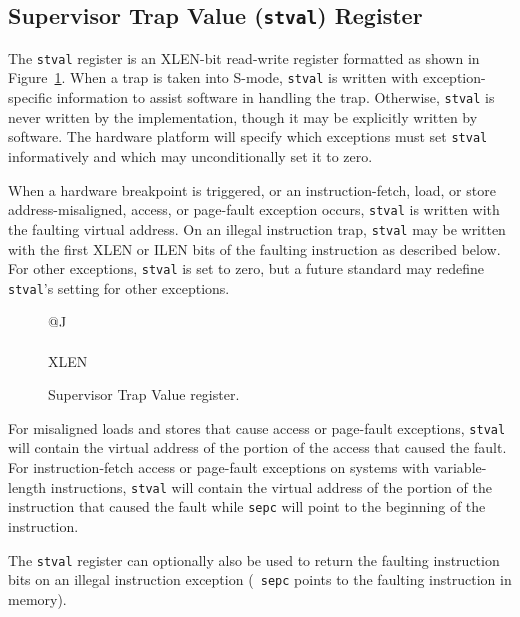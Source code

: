 \subsection{Supervisor Trap Value ({\tt stval}) Register}

The {\tt stval} register is an XLEN-bit read-write register formatted as shown
in Figure~\ref{stvalreg}.  When a trap is taken into S-mode, {\tt stval} is
written with exception-specific information to assist software in handling the
trap.  Otherwise, {\tt stval} is never written by the implementation, though
it may be explicitly written by software.  The hardware platform will specify
which exceptions must set {\tt stval} informatively and which may
unconditionally set it to zero.


When a hardware breakpoint is triggered, or an instruction-fetch, load, or
store address-misaligned, access, or page-fault exception occurs, {\tt stval}
is written with the faulting virtual address.  On an illegal instruction trap,
{\tt stval} may be written with the first XLEN or ILEN bits of the faulting
instruction as described below.  For other exceptions, {\tt stval} is set to
zero, but a future standard may redefine {\tt stval}'s setting for other
exceptions.

\begin{figure}[h!]
{\footnotesize
\begin{center}
\begin{tabular}{@{}J}
 \\
\hline
{} \\
\hline
XLEN \\
\end{tabular}
\end{center}
}
\vspace{-0.1in}
\caption{Supervisor Trap Value register.}
\label{stvalreg}
\end{figure}

For misaligned loads and stores that cause access or page-fault
exceptions, {\tt stval} will contain the virtual address of the
portion of the access that caused the fault.  For
instruction-fetch access or page-fault exceptions on systems
with variable-length instructions, {\tt stval} will contain the
virtual address of the portion of the instruction that caused
the fault while {\tt sepc} will point to the beginning of the
instruction.

The {\tt stval} register can optionally also be used to return the
faulting instruction bits on an illegal instruction exception ({\tt
  sepc} points to the faulting instruction in memory).


